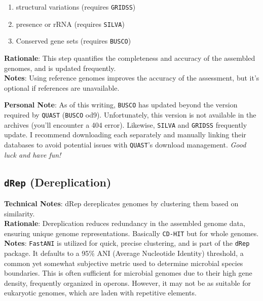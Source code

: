 \documentclass[11pt]{report}
\begin{document}
{\begin{enumerate}
\textbf{Additionally, it also detects} other metrics using modular tools
		
		\item structural variations (requires \texttt{GRIDSS})
		\item presence or rRNA (requires \texttt{SILVA})
		\item Conserved gene sets (requires \texttt{BUSCO})
		
	\end{enumerate}
\textbf{Rationale}: This step quantifies the completeness and accuracy of the assembled genomes, and is updated frequently. \\
\textbf{Notes}: Using reference genomes improves the accuracy of the assessment, but it’s optional if references are unavailable. \\

\begin{tcolorbox}[colback=gray!10!white, coltitle=white, colframe=gray!80!black, title=A Personal Note]
	\textbf{Personal Note}: As of this writing, \texttt{BUSCO} has updated beyond the version required by \texttt{QUAST} (\texttt{BUSCO} od9). Unfortunately, this version is not available in the archives (you'll encounter a 404 error). Likewise, \texttt{SILVA} and \texttt{GRIDSS} frequently update. I recommend downloading each separately and manually linking their databases to avoid potential issues with \texttt{QUAST}'s download management. \textit{Good luck and have fun!} 
\end{tcolorbox}



\subsection{\texttt{dRep} (Dereplication)}
\textbf{Technical Notes}: dRep dereplicates genomes by clustering them based on similarity. \\
\textbf{Rationale}: Dereplication reduces redundancy in the assembled genome data, ensuring unique genome representations. Basically \texttt{CD-HIT} but for whole genomes. \\
\textbf{Notes}: \texttt{FastANI} is utilized for quick, precise clustering, and is part of the \texttt{dRep} package. It defaults to a 95\% ANI (Average Nucleotide Identity) threshold, a common yet somewhat subjective metric used to determine microbial species boundaries. This is often sufficient for microbial genomes due to their high gene density, frequently organized in operons. However, it may not be as suitable for eukaryotic genomes, which are laden with repetitive elements.

}
\end{document}
